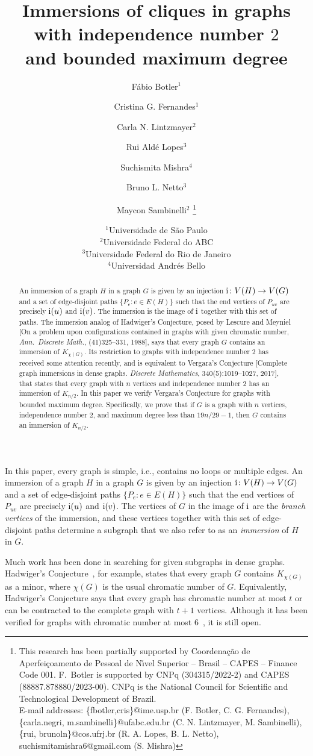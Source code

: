 \documentclass[a4paper,12pt]{article}
\title{Immersions of cliques in graphs \\ with independence number \(2\) \\ and bounded maximum degree}
\author{Fábio Botler$^1$ \and Cristina G. Fernandes$^1$ \and Carla N. Lintzmayer$^2$ \and Rui Aldé Lopes$^3$ \and Suchismita Mishra$^4$  \and Bruno L. Netto$^3$  \and Maycon Sambinelli$^2$
\footnote{
This research has been partially supported by Coordena\c cão de Aperfei\c coamento
de Pessoal de N\'\i vel Superior -- Brasil -- CAPES -- Finance Code 001.
F.~Botler is supported by CNPq {(\small 304315/2022-2)} and CAPES {(\small 88887.878880/2023-00)}.
CNPq is the National Council for Scientific and Technological Development of Brazil. \\
E-mail addresses: \{fbotler,cris\}@ime.usp.br (F. Botler, C. G. Fernandes), \{carla.negri, m.sambinelli\}@ufabc.edu.br (C. N. Lintzmayer, M. Sambinelli),
\{rui, brunoln\}@cos.ufrj.br (R. A. Lopes, B. L. Netto),
suchismitamishra6@gmail.com  (S. Mishra)
}}
\date{
$^1$Universidade de São Paulo\\%
$^2$Universidade Federal do ABC\\%
$^3$Universidade Federal do Rio de Janeiro\\%
$^4$Universidad Andrés Bello
}
\newcommand{\ifun}{{\rm i}}
\begin{document}
\maketitle

\begin{abstract}
An immersion of a graph \(H\) in a graph \(G\) is given by an injection 
\(\ifun \colon V(H) \to V(G)\) and a set of edge-disjoint paths \(\{P_e : e \in E(H)\}\) 
such that the end vertices of \(P_{uv}\) are precisely \(\ifun(u)\) and \(\ifun(v)\).
The immersion is the image of \(\ifun\) together with this set of paths. 
The immersion analog of Hadwiger's Conjecture, posed by Lescure and Meyniel 
[On a problem upon configurations contained in graphs
with given chromatic number, \emph{Ann.\ Discrete Math.}, (41)325--331, 1988],
says that every graph \(G\) contains an immersion of \(K_{\chi(G)}\).
Its restriction to graphs with independence number \(2\) has received some attention recently, 
and is equivalent to Vergara's Conjecture [Complete graph immersions in dense graphs. 
\emph{Discrete Mathematics}, 340(5):1019–1027, 2017], that states that every graph 
with \(n\) vertices and independence number 2 has an immersion of \(K_{n/2}\).
In this paper we verify Vergara's Conjecture for graphs with bounded maximum degree.
Specifically, we prove that if \(G\) is a graph with \(n\) vertices,
independence number \(2\), and maximum degree less than \(19n/29 - 1\),
then \(G\) contains an immersion of \(K_{n/2}\).
\end{abstract}

In this paper, every graph is simple, i.e., contains no loops or multiple edges.
An immersion of a graph \(H\) in a graph \(G\) is given by an injection 
\(\ifun \colon V(H) \to V(G)\) and a set of edge-disjoint paths \(\{P_e : e \in E(H)\}\) 
such that the end vertices of \(P_{uv}\) are precisely \(\ifun(u)\) and \(\ifun(v)\).
The vertices of \(G\) in the image of \(\ifun\) are the \emph{branch vertices} of the immersion, 
and these vertices together with this set of edge-disjoint paths determine a subgraph 
that we also refer to as an \emph{immersion} of \(H\) in \(G\). 

Much work has been done in searching for given subgraphs in dense graphs.
Hadwiger's Conjecture~\cite{hadwiger1943klassifikation}, for example,
states that every graph \(G\) contains \(K_{\chi(G)}\) as a minor,
where \(\chi(G)\) is the usual chromatic number of \(G\).
Equivalently, Hadwiger's Conjecture says that every graph has chromatic number at most \(t\)
or can be contracted to the complete graph with \(t+1\) vertices.
Although it has been verified for graphs with chromatic number at most \(6\)~\cite{robertson1993hadwiger}, it is still open.
\end{document}
